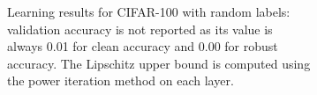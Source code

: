 \begin{figure}
\begin{subfigure}[b]{0.60\textwidth}
\begin{tabular}{cp{1.5cm}p{1.5cm}}
                \hline
            \end{tabular}
            \caption{Learning results for CIFAR-100 with random labels: validation accuracy is not reported as its value is always 0.01 for clean accuracy and 0.00 for robust accuracy. The Lipschitz upper bound is computed using the power iteration method on each layer.}
            \label{fig:cifar100-results}
        \end{subfigure}
        \caption{}
    \end{figure}

    
    
